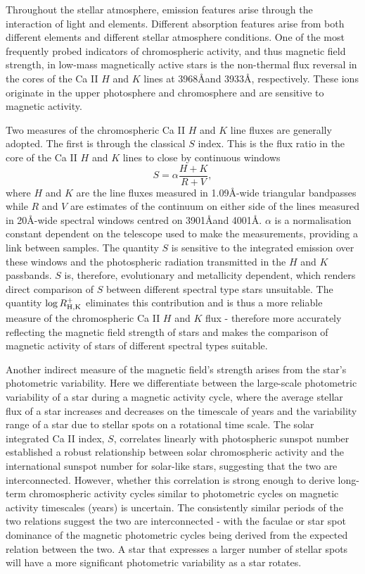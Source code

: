 Throughout the stellar atmosphere, emission features arise through the interaction of light and elements. 
Different absorption features arise from both different elements and different stellar atmosphere conditions.
One of the most frequently probed indicators of chromospheric activity, and thus magnetic field strength, in low-mass magnetically active stars is the non-thermal flux reversal in the cores of the Ca II $H$ and $K$ lines at 3968\AA and 3933\AA, respectively.
These ions originate in the upper photosphere and chromosphere and are sensitive to magnetic activity.

Two measures of the chromospheric Ca II $H$ and $K$ line fluxes are generally adopted.
The first is through the classical $S$ index.
This is the flux ratio in the core of the Ca II $H$ and $K$ lines to close by continuous windows
\begin{equation}
S = \alpha \frac{H+K}{R+V},
\end{equation}
where $H$ and $K$ are the line fluxes measured in 1.09\AA-wide triangular bandpasses while $R$ and $V$ are estimates of the continuum on either side of the lines measured in 20\AA-wide spectral windows centred on 3901\AA and 4001\AA. 
$\alpha$ is a normalisation constant dependent on the telescope used to make the measurements, providing a link between samples.
The quantity $S$ is sensitive to the integrated emission over these windows and the photospheric radiation transmitted in the $H$ and $K$ passbands. 
$S$ is, therefore, evolutionary and metallicity dependent, which renders direct comparison of $S$ between different spectral type stars unsuitable.
The quantity $\log R^{+}_{\rm{H,K}}$ eliminates this contribution \citep[See ]{lorenzo_solar_2018} and is thus a more reliable measure of the chromospheric Ca II $H$ and $K$ flux - therefore more accurately reflecting the magnetic field strength of stars and makes the comparison of magnetic activity of stars of different spectral types suitable.

Another indirect measure of the magnetic field's strength arises from the star's photometric variability.
Here we differentiate between the large-scale photometric variability of a star during a magnetic activity cycle, where the average stellar flux of a star increases and decreases on the timescale of years and the variability range of a star due to stellar spots on a rotational time scale.
The solar integrated Ca II index, $S$, correlates linearly with photospheric sunspot number \citep{lorenzo_fine_2016, lorenzo_solar_2018} established a robust relationship between solar chromospheric activity and the international sunspot number for solar-like stars, suggesting that the two are interconnected. 
However, whether this correlation is strong enough to derive long-term chromospheric activity cycles similar to photometric cycles on magnetic activity timescales (years) is uncertain.
The consistently similar periods of the two relations suggest the two are interconnected - with the faculae or star spot dominance of the magnetic photometric cycles being derived from the expected relation between the two.
A star that expresses a larger number of stellar spots will have a more significant photometric variability as a star rotates.

